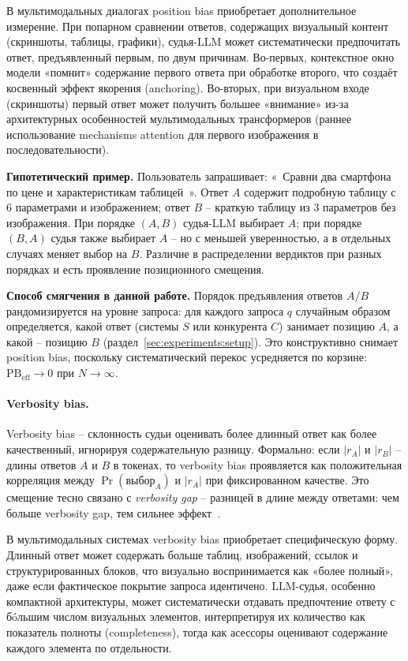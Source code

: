 В мультимодальных диалогах position bias приобретает
дополнительное измерение.
При попарном сравнении ответов, содержащих визуальный контент
(скриншоты, таблицы, графики), судья-LLM может систематически
предпочитать ответ, предъявленный первым, по двум причинам.
Во-первых, контекстное окно модели «помнит» содержание первого
ответа при обработке второго, что создаёт косвенный эффект
якорения (anchoring).
Во-вторых, при визуальном входе (скриншоты) первый ответ может
получить большее «внимание» из-за архитектурных особенностей
мультимодальных трансформеров (раннее использование mechanisms
attention для первого изображения в последовательности).

\textbf{Гипотетический пример.}
Пользователь запрашивает: «~Сравни два смартфона по цене и
характеристикам таблицей~».
Ответ $A$ содержит подробную таблицу с 6 параметрами и
изображением; ответ $B$ -- краткую таблицу из 3 параметров
без изображения.
При порядке $(A, B)$ судья-LLM выбирает $A$; при порядке
$(B, A)$ судья также выбирает $A$ -- но с меньшей уверенностью,
а в отдельных случаях меняет выбор на $B$.
Различие в распределении вердиктов при разных порядках и
есть проявление позиционного смещения.

\textbf{Способ смягчения в данной работе.}
Порядок предъявления ответов $A/B$ рандомизируется на уровне
запроса: для каждого запроса $q$ случайным образом
определяется, какой ответ (системы $S$ или конкурента $C$)
занимает позицию $A$, а какой -- позицию $B$
(раздел~\ref{sec:experiments:setup}).
Это конструктивно снимает position bias, поскольку
систематический перекос усредняется по корзине:
$\mathrm{PB}_{\text{eff}} \to 0$ при $N \to \infty$.

\paragraph{Verbosity bias.}
Verbosity bias -- склонность судьи оценивать более длинный
ответ как более качественный, игнорируя содержательную
разницу.
Формально: если $|r_A|$ и $|r_B|$ -- длины ответов $A$ и $B$
в токенах, то verbosity bias проявляется как положительная
корреляция между $\Pr(\text{выбор}_A)$ и $|r_A|$ при фиксированном
качестве.
Это смещение тесно связано с \emph{verbosity gap} -- разницей
в длине между ответами: чем больше verbosity gap, тем сильнее
эффект~\cite{ye2024justice}.

В мультимодальных системах verbosity bias приобретает
специфическую форму.
Длинный ответ может содержать больше таблиц, изображений,
ссылок и структурированных блоков, что визуально
воспринимается как «более полный», даже если фактическое
покрытие запроса идентичено.
LLM-судья, особенно компактной архитектуры, может
 систематически отдавать предпочтение ответу с бóльшим
 числом визуальных элементов, интерпретируя их количество как
 показатель полноты (completeness), тогда как асессоры
 оценивают содержание каждого элемента по отдельности.


